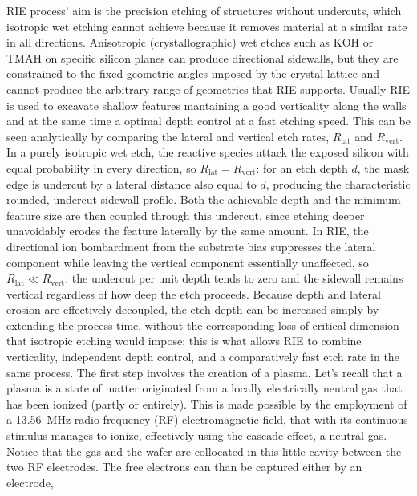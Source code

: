 \begin{itemize}
    RIE process' aim is the precision etching of structures without undercuts, which isotropic wet etching cannot achieve because it removes material at a similar rate in all directions. Anisotropic (crystallographic) wet etches such as KOH or TMAH on specific silicon planes can produce directional sidewalls, but they are constrained to the fixed geometric angles imposed by the crystal lattice and cannot produce the arbitrary range of geometries that RIE supports.
    Usually RIE is used to excavate shallow features mantaining a
    good verticality along the walls and at the same time a optimal
    depth control at
    a fast etching speed.
    This can be seen analytically by comparing the lateral and vertical
    etch rates, $R_\text{lat}$ and $R_\text{vert}$. In a purely isotropic
    wet etch, the reactive species attack the exposed silicon with equal
    probability in every direction, so $R_\text{lat} = R_\text{vert}$: for
    an etch depth $d$, the mask edge is undercut by a lateral distance
    also equal to $d$, producing the characteristic rounded, undercut
    sidewall profile. Both the achievable depth and the minimum feature
    size are then coupled through this undercut, since etching deeper
    unavoidably erodes the feature laterally by the same amount. In RIE,
    the directional ion bombardment from the substrate bias suppresses
    the lateral component while leaving the vertical component
    essentially unaffected, so $R_\text{lat} \ll R_\text{vert}$: the
    undercut per unit depth tends to zero and the sidewall remains
    vertical regardless of how deep the etch proceeds. Because depth and
    lateral erosion are effectively decoupled, the etch depth can be
    increased simply by extending the process time, without the
    corresponding loss of critical dimension that isotropic etching would
    impose; this is what allows RIE to combine verticality, independent
    depth control, and a comparatively fast etch rate in the same
    process.
    The first step involves the creation of a plasma. Let's recall
    that a plasma is a state of matter
    originated from a locally electrically neutral gas that has been
    ionized (partly or entirely). This is made possible by the employment of
    a \SI{13.56}{\mega \hertz} radio
    frequency (RF) electromagnetic field, that
    with its continuous stimulus manages to ionize, effectively using
    the cascade effect, a neutral gas. Notice that the gas and the
    wafer are collocated in this little cavity between the two RF electrodes.
    The free electrons can than be captured either by an electrode,

\end{itemize}
